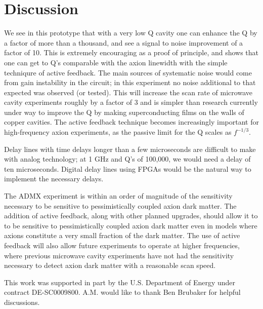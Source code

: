 \documentclass[aps,prl,twocolumn,groupedaddress]{revtex4-1}
\begin{document}
\section{Discussion}

We see in this prototype that with a very low Q cavity one can enhance the Q by a factor of more than a thousand, and see a signal to noise improvement of a factor of 10. This is extremely encouraging as a proof of principle, and shows that one can get to Q's comparable with the axion linewidth with the simple techniqure of active feedback. The main sources of systematic noise would come from gain instability in the circuit; in this experiment no noise additional to that expected was observed (or tested). This will increase the scan rate of microwave cavity experiments roughly by a factor of 3 and is simpler than research currently under way to improve the Q by making superconducting films on the walls of copper cavities. The active feedback technique becomes increasingly important for high-frequency axion experiments, as the passive limit for the Q scales as $f^{-1/3}$.

Delay lines with time delays longer than a few microseconds are difficult to make with analog technology; at 1 GHz and Q's of 100,000, we would need a delay of ten microseconds. Digital delay lines using FPGAs would be the natural way to implement the necessary delays.


The ADMX experiment is within an order of magnitude of the sensitivity necessary to be sensitive to pessimistically coupled axion dark matter.  The addition of active feedback, along with other planned upgrades, should allow it to to be sensitive to pessimistically coupled axion dark matter even in models where axions constitute a very small fraction of the dark matter.  The use of active feedback will also allow future experiments to operate at higher frequencies, where previous microwave cavity experiments have not had the sensitivity necessary to detect axion dark matter with a reasonable scan speed.

This work was supported in part by the U.S. Department of Energy under contract DE-SC0009800. A.M. would like to thank Ben Brubaker for helpful discussions.


\end{document}
